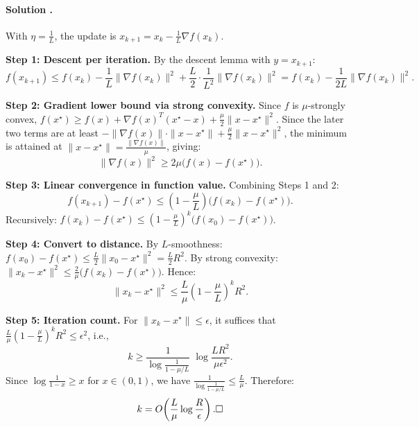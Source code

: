 \documentclass{article}
\newcounter{solutionCount}
\newcommand{\solution}[1]{
    \stepcounter{solutionCount}
    \paragraph{Solution \thesolutionCount.}
    {
        #1
    }
}
\begin{document}
\solution{
    With $\eta = \frac{1}{L}$, the update is $x_{k+1} = x_k - \frac{1}{L}\nabla f(x_k)$.

    \textbf{Step 1: Descent per iteration.}
    By the descent lemma with $y = x_{k+1}$:
    \[
    f(x_{k+1}) \le f(x_k) - \frac{1}{L}\|\nabla f(x_k)\|^2 + \frac{L}{2}\cdot\frac{1}{L^2}\|\nabla f(x_k)\|^2
    = f(x_k) - \frac{1}{2L}\|\nabla f(x_k)\|^2.
    \]

    \textbf{Step 2: Gradient lower bound via strong convexity.}
    Since $f$ is $\mu$-strongly convex, $f(x^\star) \ge f(x) + \nabla f(x)^T(x^\star - x) + \frac{\mu}{2}\|x-x^\star\|^2$. Since the later two terms are at least $-\|\nabla f(x)\|\cdot\|x-x^\star\| + \frac{\mu}{2}\|x-x^\star\|^2$, the minimum is attained at $\|x-x^\star\| = \frac{\|\nabla f(x)\|}{\mu}$, giving:
    \[
    \|\nabla f(x)\|^2 \ge 2\mu\big(f(x) - f(x^\star)\big).
    \]

    \textbf{Step 3: Linear convergence in function value.}
    Combining Steps 1 and 2:
    \[
    f(x_{k+1}) - f(x^\star) \le \left(1-\frac{\mu}{L}\right)\big(f(x_k)-f(x^\star)\big).
    \]
    Recursively: $f(x_k)-f(x^\star) \le \left(1-\frac{\mu}{L}\right)^k\!\big(f(x_0)-f(x^\star)\big)$.

    \textbf{Step 4: Convert to distance.}
    By $L$-smoothness: $f(x_0)-f(x^\star) \le \frac{L}{2}\|x_0-x^\star\|^2 = \frac{L}{2}R^2$.
    By strong convexity: $\|x_k-x^\star\|^2 \le \frac{2}{\mu}\big(f(x_k)-f(x^\star)\big)$. Hence:
    \[
    \|x_k - x^\star\|^2 \le \frac{L}{\mu}\!\left(1-\frac{\mu}{L}\right)^k R^2.
    \]

    \textbf{Step 5: Iteration count.}
    For $\|x_k-x^\star\|\le\epsilon$, it suffices that $\frac{L}{\mu}(1-\frac{\mu}{L})^k R^2 \le \epsilon^2$, i.e.,
    \[
    k \ge \frac{1}{\log\!\frac{1}{1-\mu/L}}\;\log\frac{LR^2}{\mu\epsilon^2}.
    \]
    Since $\log\frac{1}{1-x}\ge x$ for $x\in(0,1)$, we have $\frac{1}{\log\frac{1}{1-\mu/L}}\le\frac{L}{\mu}$. Therefore:
    \[
    k = O\!\left(\frac{L}{\mu}\log\frac{R}{\epsilon}\right). \hfill\square
    \]
}
\end{document}
